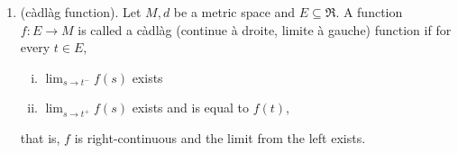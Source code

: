 \documentclass[a4paper,10pt]{scrbook}
\begin{document}
\begin{enumerate}
 \item (\hypertarget{link:cadlag}{c\`adl\`ag function}). Let \(M, d\) be a metric space and \(E \subseteq \Re\). A function \(f: E \to M\) is 
       called a c\`adl\`ag (continue \`a droite, limite \`a gauche) function if for every \(t \in E\), 
       \begin{enumerate}[i.]
        \item \( \lim_{s \to t^{-}} f(s) \) exists
        \item \( \lim_{s \to t^{+}} f(s) \) exists and is equal to \(f(t)\),
       \end{enumerate}
       that is, \(f\) is right-continuous and the limit from the left exists.

\end{enumerate}
\end{document}
